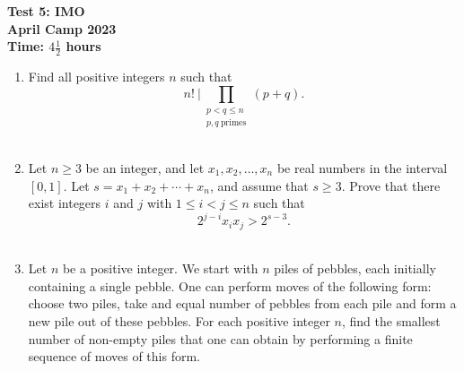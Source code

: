\documentclass{article}
\begin{document}
\thispagestyle{empty}

\begin{center}
  \textbf{\Large Test 5: IMO}
  \\ \vspace{1em}
  \textbf{\large April Camp 2023}
  \\ \vspace{1em}
  \textbf{\large Time: $4\frac{1}{2}$ hours}
\end{center}

\bigskip
\vfill

\begin{enumerate}[itemsep=\medskipamount]

\item %
Find all positive integers $n$ such that
\[ n! \ \mathrel{\biggl\vert} \prod_{\substack{p < q \leq n \\ p,q\ \text{primes}}} (p+q). \]~


\item %
Let $n \geq 3$ be an integer, and let $x_1, x_2, \dotsc, x_n$ be real numbers in the interval $[0,1]$.
Let $s = x_1+x_2+\dotsb+x_n$, and assume that $s \geq 3$.
Prove that there exist integers $i$ and $j$ with $1 \leq i < j \leq n$ such that
\[ 2^{j-i} x_i x_j > 2^{s-3}. \]~


\item %
Let $n$ be a positive integer.
We start with $n$ piles of pebbles, each initially containing a single pebble.
One can perform moves of the following form: choose two piles, take and equal number of pebbles from each pile and form a new pile out of these pebbles.
For each positive integer $n$, find the smallest number of non-empty piles that one can obtain by performing a finite sequence of moves of this form.


\end{enumerate}
\end{document}
